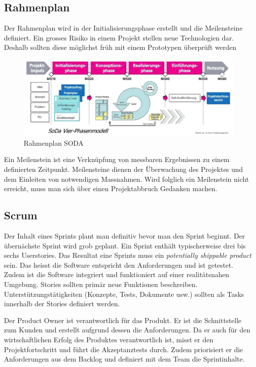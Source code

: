 \subsection{Rahmenplan}

Der Rahmenplan wird in der Initialisierungsphase erstellt und die Meilensteine definiert. Ein grosses Risiko in einem Projekt stellen neue Technologien dar. Deshalb sollten diese möglichst früh mit einem Prototypen überprüft werden

\begin{figure}[h!]
\centering
\includegraphics[width=0.8\linewidth]{fig/rahmenplan}
\caption{Rahmenplan SODA}
\label{fig:rahmenplan}
\end{figure}

Ein Meilenstein ist eine Verknüpfung von messbaren Ergebnissen zu einem definierten Zeitpunkt. Meilensteine dienen der Überwachung des Projektes und dem Einleiten von notwendigen Massnahmen. Wird folglich ein Meilenstein nicht erreicht, muss man sich über einen Projektabbruch Gedanken machen.

\subsection{Scrum}

Der Inhalt eines Sprints plant man definitiv bevor man den Sprint beginnt. Der übernächste Sprint wird grob geplant. Ein Sprint enthält typischerweise drei bis sechs Userstories. Das Resultat eine Sprints muss ein \emph{potentially shippable product} sein. Das heisst die Software entspricht den Anforderungen und ist getestet. Zudem ist die Software integriert und funktioniert auf einer realitätsnahen Umgebung. Stories sollten primär neue Funktionen beschreiben. Unterstützungstätigkeiten (Konzepte, Tests, Dokumente usw.) sollten als Tasks innerhalb der Stories definiert werden.

Der Product Owner ist verantwortlich für das Produkt. Er ist die Schnittstelle zum Kunden und erstellt aufgrund dessen die Anforderungen. Da er auch für den wirtschaftlichen Erfolg des Produktes verantwortlich ist, misst er den Projektfortschritt und führt die Akzeptanztests durch. Zudem priorisiert er die Anforderungen aus dem Backlog und definiert mit dem Team die Sprintinhalte.

